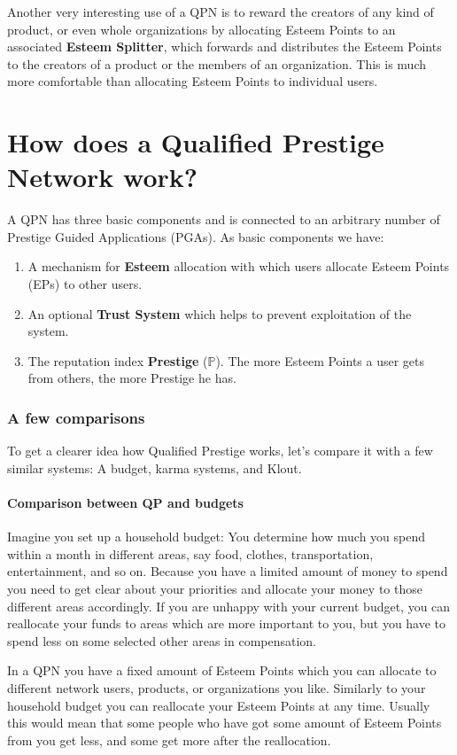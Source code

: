 \documentclass[a4paper,12pt]{scrartcl}
\begin{document}
Another very interesting use of a QPN is to reward the creators of any kind of product, or even whole organizations by allocating Esteem Points to an associated \textbf{Esteem Splitter}, which forwards and distributes the Esteem Points to the creators of a product or the members of an organization. This is much more comfortable than allocating Esteem Points to individual users.

\part{How does a Qualified Prestige Network work?}
A QPN has three basic components and is connected to an arbitrary number of Prestige Guided Applications (PGAs). As basic components we have:
\begin{enumerate}
 \item A mechanism for \textbf{Esteem} allocation with which users allocate Esteem Points (EPs) to other users.
 \item An optional \textbf{Trust System} which helps to prevent exploitation of the system.
 \item The reputation index \textbf{Prestige} ($\mathbb{P}$). The more Esteem Points a user gets from others, the more Prestige he has.
\end{enumerate}

\section{A few comparisons}
To get a clearer idea how Qualified Prestige works, let's compare it with a few similar systems: A budget, karma systems, and Klout.

\subsection{Comparison between QP and budgets}
Imagine you set up a household budget: You determine how much you spend within a month in different areas, say food, clothes, transportation, entertainment, and so on. Because you have a limited amount of money to spend you need to get clear about your priorities and allocate your money to those different areas accordingly. If you are unhappy with your current budget, you can reallocate your funds to areas which are more important to you, but you have to spend less on some selected other areas in compensation.

In a QPN you have a fixed amount of Esteem Points which you can allocate to different network users, products, or organizations you like. Similarly to your household budget you can reallocate your Esteem Points at any time. Usually this would mean that some people who have got some amount of Esteem Points from you get less, and some get more after the reallocation.
\end{document}
